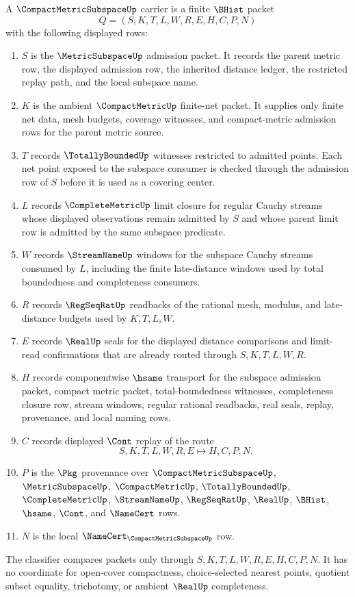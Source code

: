 \begin{definition}
\label{def:compact-metric-subspace-carrier}
A $\CompactMetricSubspaceUp$ carrier is a finite $\BHist$ packet
$$
Q=(S,K,T,L,W,R,E,H,C,P,N)
$$
with the following displayed rows:
\begin{enumerate}
\item $S$ is the $\MetricSubspaceUp$ admission packet. It records the parent metric row, the displayed admission row, the inherited distance ledger, the restricted replay path, and the local subspace name.
\item $K$ is the ambient $\CompactMetricUp$ finite-net packet. It supplies only finite net data, mesh budgets, coverage witnesses, and compact-metric admission rows for the parent metric source.
\item $T$ records $\TotallyBoundedUp$ witnesses restricted to admitted points. Each net point exposed to the subspace consumer is checked through the admission row of $S$ before it is used as a covering center.
\item $L$ records $\CompleteMetricUp$ limit closure for regular Cauchy streams whose displayed observations remain admitted by $S$ and whose parent limit row is admitted by the same subspace predicate.
\item $W$ records $\StreamNameUp$ windows for the subspace Cauchy streams consumed by $L$, including the finite late-distance windows used by total boundedness and completeness consumers.
\item $R$ records $\RegSeqRatUp$ readbacks of the rational mesh, modulus, and late-distance budgets used by $K,T,L,W$.
\item $E$ records $\RealUp$ seals for the displayed distance comparisons and limit-read confirmations that are already routed through $S,K,T,L,W,R$.
\item $H$ records componentwise $\hsame$ transport for the subspace admission packet, compact metric packet, total-boundedness witnesses, completeness closure row, stream windows, regular rational readbacks, real seals, replay, provenance, and local naming rows.
\item $C$ records displayed $\Cont$ replay of the route
$$
S,K,T,L,W,R,E \longmapsto H,C,P,N .
$$
\item $P$ is the $\Pkg$ provenance over $\CompactMetricSubspaceUp$, $\MetricSubspaceUp$, $\CompactMetricUp$, $\TotallyBoundedUp$, $\CompleteMetricUp$, $\StreamNameUp$, $\RegSeqRatUp$, $\RealUp$, $\BHist$, $\hsame$, $\Cont$, and $\NameCert$ rows.
\item $N$ is the local $\NameCert_{\CompactMetricSubspaceUp}$ row.
\end{enumerate}
The classifier compares packets only through $S,K,T,L,W,R,E,H,C,P,N$. It has no coordinate for open-cover compactness, choice-selected nearest points, quotient subset equality, trichotomy, or ambient $\RealUp$ completeness.
\end{definition}

